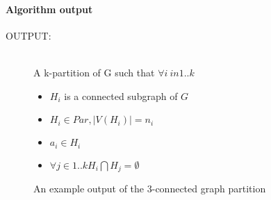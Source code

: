 \paragraph{Algorithm output}
       \begin{description}
                \item[OUTPUT:] \hfill \\
                        A k-partition of G such that $\forall i \ in 1..k$ 
                        \begin{itemize} 
                                \item $H_i$ is a connected subgraph of $G$
                                \item $H_i \in Par, |V(H_i)| = n_i $
                                \item $a_i \in H_i $
                                \item $\forall j \in 1..k H_i \bigcap H_j = \emptyset$
                        \end{itemize}
        \end{description}
             \begin{figure}[H]
	       \begin{center}
	         
	       \end{center}
	       \caption{An example output of the 3-connected graph partition}
             \end{figure}
